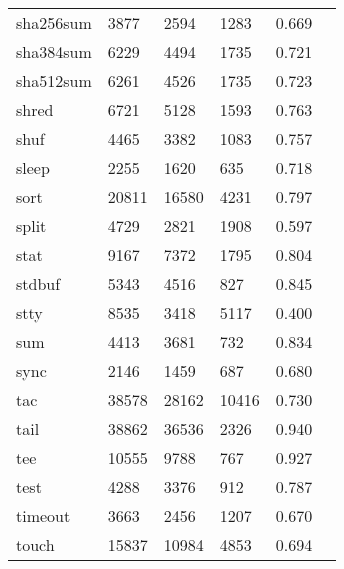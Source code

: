 \begin{longtable}{lp{2.40cm}p{2.40cm}p{2.40cm}p{2.40cm}p{2.40cm}}
sha256sum &                     3877 &         2594 &          1283 &                    0.669 \\
sha384sum &                     6229 &         4494 &          1735 &                    0.721 \\
sha512sum &                     6261 &         4526 &          1735 &                    0.723 \\
shred     &                     6721 &         5128 &          1593 &                    0.763 \\
shuf      &                     4465 &         3382 &          1083 &                    0.757 \\
sleep     &                     2255 &         1620 &           635 &                    0.718 \\
sort      &                    20811 &        16580 &          4231 &                    0.797 \\
split     &                     4729 &         2821 &          1908 &                    0.597 \\
stat      &                     9167 &         7372 &          1795 &                    0.804 \\
stdbuf    &                     5343 &         4516 &           827 &                    0.845 \\
stty      &                     8535 &         3418 &          5117 &                    0.400 \\
sum       &                     4413 &         3681 &           732 &                    0.834 \\
sync      &                     2146 &         1459 &           687 &                    0.680 \\
tac       &                    38578 &        28162 &         10416 &                    0.730 \\
tail      &                    38862 &        36536 &          2326 &                    0.940 \\
tee       &                    10555 &         9788 &           767 &                    0.927 \\
test      &                     4288 &         3376 &           912 &                    0.787 \\
timeout   &                     3663 &         2456 &          1207 &                    0.670 \\
touch     &                    15837 &        10984 &          4853 &                    0.694 \\

\end{longtable}
